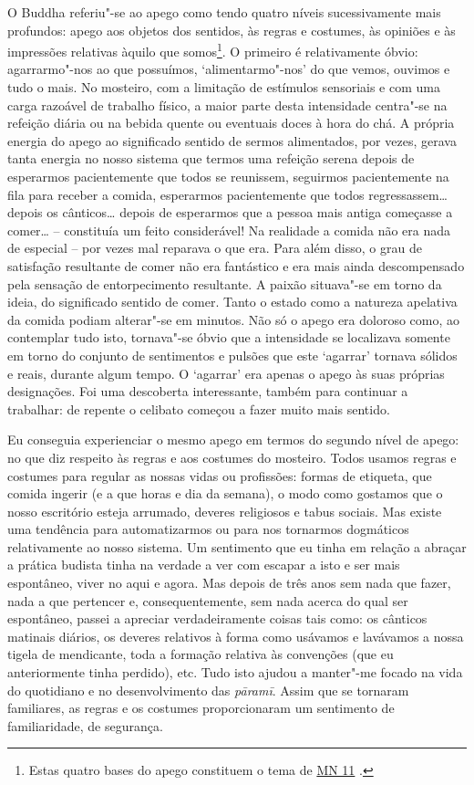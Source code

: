 O Buddha referiu"-se ao apego como tendo quatro níveis sucessivamente mais profundos: apego aos objetos dos sentidos, às regras e costumes, às opiniões e às impressões relativas àquilo que somos\footnote{Estas quatro bases do apego constituem o tema de \href{https://suttacentral.net/mn11/en/bodhi}{MN 11} .}. O primeiro é relativamente óbvio: agarrarmo"-nos ao que possuímos, `alimentarmo"-nos' do que vemos, ouvimos e tudo o mais. No mosteiro, com a limitação de estímulos sensoriais e com uma carga razoável de trabalho físico, a maior parte desta intensidade centra"-se na refeição diária ou na bebida quente ou eventuais doces à hora do chá. A própria energia do apego ao significado sentido de sermos alimentados, por vezes, gerava tanta energia no nosso sistema que termos uma refeição serena depois de esperarmos pacientemente que todos se reunissem, seguirmos pacientemente na fila para receber a comida, esperarmos pacientemente que todos regressassem\ldots{} depois os cânticos\ldots{} depois de esperarmos que a pessoa mais antiga começasse a comer\ldots{} -- constituía um feito considerável! Na realidade a comida não era nada de especial -- por vezes mal reparava o que era. Para além disso, o grau de satisfação resultante de comer não era fantástico e era mais ainda descompensado pela sensação de entorpecimento resultante. A paixão situava"-se em torno da ideia, do significado sentido de comer. Tanto o estado como a natureza apelativa da comida podiam alterar"-se em minutos. Não só o apego era doloroso como, ao contemplar tudo isto, tornava"-se óbvio que a intensidade se localizava somente em torno do conjunto de sentimentos e pulsões que este `agarrar' tornava sólidos e reais, durante algum tempo. O `agarrar' era apenas o apego às suas próprias designações. Foi uma descoberta interessante, também para continuar a trabalhar: de repente o celibato começou a fazer muito mais sentido.

Eu conseguia experienciar o mesmo apego em termos do segundo nível de apego: no que diz respeito às regras e aos costumes do mosteiro. Todos usamos regras e costumes para regular as nossas vidas ou profissões: formas de etiqueta, que comida ingerir (e a que horas e dia da semana), o modo como gostamos que o nosso escritório esteja arrumado, deveres religiosos e tabus sociais. Mas existe uma tendência para automatizarmos ou para nos tornarmos dogmáticos relativamente ao nosso sistema. Um sentimento que eu tinha em relação a abraçar a prática budista tinha na verdade a ver com escapar a isto e ser mais espontâneo, viver no aqui e agora. Mas depois de três anos sem nada que fazer, nada a que pertencer e, consequentemente, sem nada acerca do qual ser espontâneo, passei a apreciar verdadeiramente coisas tais como: os cânticos matinais diários, os deveres relativos à forma como usávamos e lavávamos a nossa tigela de mendicante, toda a formação relativa às convenções (que eu anteriormente tinha perdido), etc. Tudo isto ajudou a manter"-me focado na vida do quotidiano e no desenvolvimento das \emph{pāramī}. Assim que se tornaram familiares, as regras e os costumes proporcionaram um sentimento de familiaridade, de segurança.


